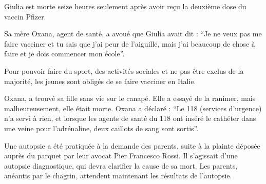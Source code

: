 Giulia est morte seize heures seulement après avoir reçu la deuxième dose du
vaccin Pfizer.

Sa mère Oxana, agent de santé, a avoué que Giulia avait dit : “Je ne veux pas me
faire vacciner et tu sais que j'ai peur de l'aiguille, mais j'ai beaucoup de
chose à faire et je dois commencer mon école”.

Pour pouvoir faire du sport, des activités sociales et ne pas être exclus de la
majorité, les jeunes sont obligés de se faire vacciner en Italie.

Oxana, a trouvé sa fille sans vie sur le canapé. Elle a essayé de la ranimer,
mais malheureusement, elle était morte. Oxana a déclaré : “Le 118 (services
d'urgence) n'a servi à rien, et lorsque les agents de santé du 118 ont inséré le
cathéter dans une veine pour l'adrénaline, deux caillots de sang sont sortis”.

Une autopsie a été pratiquée à la demande des parents, suite à la plainte
déposée auprès du parquet par leur avocat Pier Francesco Rossi. Il s'agissait
d'une autopsie diagnostique, qui devra clarifier la cause de sa mort. Les
parents, anéantis par le chagrin, attendent maintenant les résultats de
l'autopsie.

